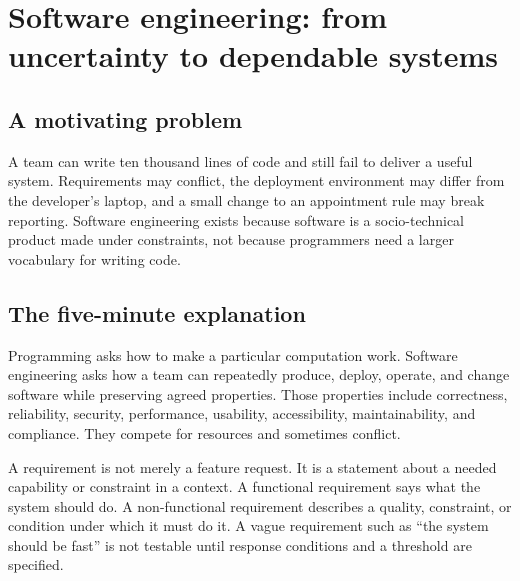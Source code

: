 \chapter{Software engineering: from uncertainty to dependable systems}
\label{ch:software-engineering}

\section{A motivating problem}
A team can write ten thousand lines of code and still fail to deliver a useful system. Requirements may conflict, the deployment environment may differ from the developer's laptop, and a small change to an appointment rule may break reporting. Software engineering exists because software is a socio-technical product made under constraints, not because programmers need a larger vocabulary for writing code.


\section{The five-minute explanation}
Programming asks how to make a particular computation work. Software engineering asks how a team can repeatedly produce, deploy, operate, and change software while preserving agreed properties. Those properties include correctness, reliability, security, performance, usability, accessibility, maintainability, and compliance. They compete for resources and sometimes conflict.

A requirement is not merely a feature request. It is a statement about a needed capability or constraint in a context. A functional requirement says what the system should do. A non-functional requirement describes a quality, constraint, or condition under which it must do it. A vague requirement such as \enquote{the system should be fast} is not testable until response conditions and a threshold are specified.

